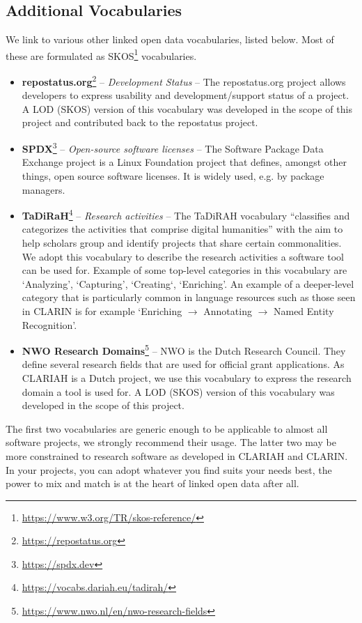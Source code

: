 \documentclass[a4paper,11pt]{article}
\begin{document}
\subsection{Additional Vocabularies}

We link to various other linked open data vocabularies, listed below. Most of these are
formulated as SKOS\footnote{\url{https://www.w3.org/TR/skos-reference/}}
vocabularies.

\begin{itemize}
\item \textbf{repostatus.org}\footnote{\url{https://repostatus.org}} -- \emph{Development Status} -- The repostatus.org project allows developers to express usability and development/support status of a project.
A LOD (SKOS) version of this vocabulary was developed in the scope of this project and contributed back to the repostatus project.
\item \textbf{SPDX}\footnote{\url{https://spdx.dev}} -- \emph{Open-source software licenses} -- The Software Package Data Exchange project is a Linux Foundation project that defines, amongst other things, open source software licenses. It is widely used, e.g. by package managers. 
\item \textbf{TaDiRaH}\footnote{\url{https://vocabs.dariah.eu/tadirah/}} -- \emph{Research activities} -- The TaDiRAH vocabulary ``classifies and categorizes the activities that comprise digital humanities'' \citep{TADIRAH} with the aim to help scholars group and identify projects that share certain commonalities.
We adopt this vocabulary to describe the research activities a software tool can be used for. Example of some top-level categories in this vocabulary are `Analyzing', `Capturing', `Creating`, `Enriching'. An example of a deeper-level category that is particularly common in language resources such as those 
seen in CLARIN is for example `Enriching $\rightarrow$ Annotating $\rightarrow$ Named Entity Recognition'.
\item \textbf{NWO Research Domains}\footnote{\url{https://www.nwo.nl/en/nwo-research-fields}} -- NWO is the Dutch Research Council. They define several research fields that are used for official grant applications. As CLARIAH is a Dutch project, we use this vocabulary to express the research domain a tool is used for. A LOD (SKOS) version of this vocabulary was developed in the scope of this project.
\end{itemize}

The first two vocabularies are generic enough to be applicable to almost all
software projects, we strongly recommend their usage. The latter two may be
more constrained to research software as developed in CLARIAH and CLARIN. In
your projects, you can adopt whatever you find suits your needs best, the power to mix and
match is at the heart of linked open data after all.
\end{document}
